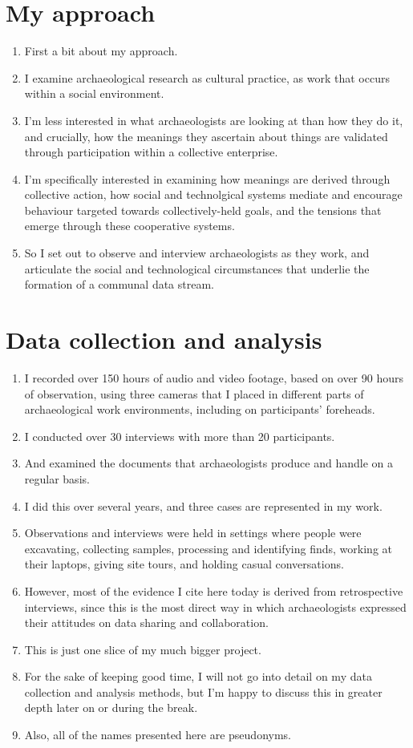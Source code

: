 \documentclass[12pt]{article}
\begin{document}
\section{My approach}
\begin{enumerate}
  \item First a bit about my approach.
  \item I examine archaeological research as cultural practice, as work that occurs within a social environment.
  \item I'm less interested in what archaeologists are looking at than how they do it, and crucially, how the meanings they ascertain about things are validated through participation within a collective enterprise.
  \item I'm specifically interested in examining how meanings are derived through collective action, how social and technolgical systems mediate and encourage behaviour targeted towards collectively-held goals, and the tensions that emerge through these cooperative systems.
  \item So I set out to observe and interview archaeologists as they work, and articulate the social and technological circumstances that underlie the formation of a communal data stream.
\end{enumerate}

\section{Data collection and analysis}
\begin{enumerate}
  \item I recorded over 150 hours of audio and video footage, based on over 90 hours of observation, using three cameras that I placed in different parts of archaeological work environments, including on participants' foreheads.
  \item I conducted over 30 interviews with more than 20 participants.
  \item And examined the documents that archaeologists produce and handle on a regular basis.
  \item I did this over several years, and three cases are represented in my work.
  \item Observations and interviews were held in settings where people were excavating, collecting samples, processing and identifying finds, working at their laptops, giving site tours, and holding casual conversations.
  \item However, most of the evidence I cite here today is derived from retrospective interviews, since this is the most direct way in which archaeologists expressed their attitudes on data sharing and collaboration.
  \item This is just one slice of my much bigger project.
  \item For the sake of keeping good time, I will not go into detail on my data collection and analysis methods, but I'm happy to discuss this in greater depth later on or during the break.
  \item Also, all of the names presented here are pseudonyms.
\end{enumerate}
\end{document}
